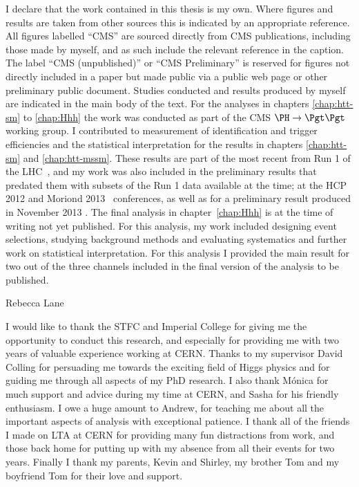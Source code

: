 \begin{declaration}
  I declare that the work contained in this thesis is my own. Where figures and
  results are taken from other sources this is indicated by an appropriate
  reference. All figures labelled ``CMS'' are sourced directly from CMS
  publications, including those made by myself, and as such include the
  relevant reference in the caption. The label ``CMS (unpublished)'' or ``CMS
  Preliminary'' is reserved for figures not directly included in a paper but 
  made public via a public web page or other preliminary public document.
  Studies conducted and results produced by myself are indicated in the main
  body of the text. For the analyses in chapters \ref{chap:htt-sm} to \ref{chap:Hhh}
  the work was conducted as part of the CMS $\PH\to\Pgt\Pgt$ working group. I
  contributed to measurement of identification and trigger efficiencies and
  the statistical interpretation for the results in chapters \ref{chap:htt-sm}
  and \ref{chap:htt-mssm}. These results are part of the most recent
  from Run 1 of the LHC~\cite{HIG-13-004,HIG-13-021}, and my work
  was also included in the preliminary results that predated them with subsets
  of the Run 1 data available at the time; at the HCP 2012
  \cite{CMS-PAS-HIG-12-050,CMS-PAS-HIG-12-043}
  and Moriond 2013~\cite{CMS-PAS-HIG-13-004-mor} conferences, as well as for a preliminary result
  produced in November 2013 \cite{CMS-PAS-HIG-13-021}. The final analysis in
  chapter~\ref{chap:Hhh} is at the time of writing not yet published. For this
  analysis, my work included designing event selections, studying
  background methods and evaluating systematics and further work on statistical
  interpretation. For this analysis I provided the main result for two out of
  the three channels included in the final version of the analysis to be
  published.
  \vspace*{1cm}
  \begin{flushright}
    Rebecca Lane
  \end{flushright}
\end{declaration}


\begin{acknowledgements}
  I would like to thank the STFC and Imperial College for giving me the
  opportunity to conduct this research, and especially for providing me with two
  years of valuable experience working at CERN. Thanks to my supervisor David
  Colling for persuading me towards the exciting field of Higgs physics and for
  guiding me through all aspects of my PhD research. I also thank M\'{o}nica for
  much support and advice during my time at CERN, and Sasha for his friendly
  enthusiasm. I owe a huge amount to Andrew, for teaching me about all the important
  aspects of analysis with exceptional patience. I thank all of the friends I
  made on LTA at CERN for providing many fun distractions from work, and those
  back home for putting up with my absence from all their events for two
  years. Finally I thank my parents, Kevin and Shirley, my brother Tom and my
  boyfriend Tom for their love and support.  
\end{acknowledgements}


